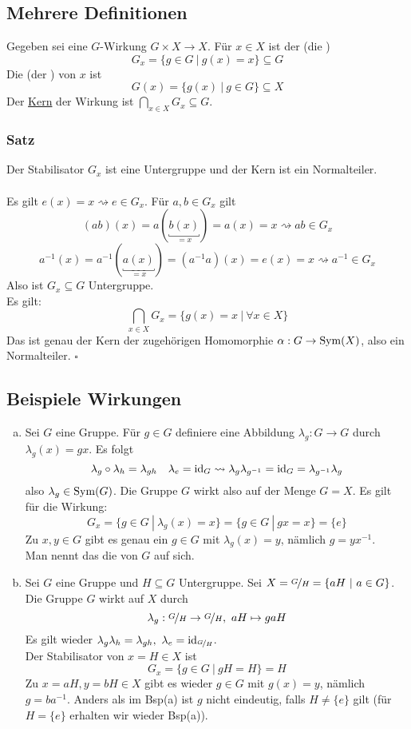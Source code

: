 \subsection{Mehrere Definitionen}
\label{sub:mehrere_def}
Gegeben sei eine $G$-Wirkung $G\times X\to X$. 
Für $x\in X$ ist der  (die )
\[
G_x=\{g\in G~|~g(x)=x \}\subseteq G 
\]
Die  (der ) von $x$ ist 
\[
G(x)=\{g(x)~|~g\in G \}\subseteq X 
\]
Der \uline{Kern} der Wirkung ist $\bigcap\limits_{x\in X}G_x\subseteq G$.

\subsubsection*{Satz}
Der Stabilisator $G_x$ ist eine Untergruppe und der Kern ist ein Normalteiler.\\

\\
Es gilt $e(x)=x \rightsquigarrow e\in G_x$. 
Für $a,b\in G_x$ gilt 
\[
(ab)(x)=a(\underbracket{b(x)}_{=x})=a(x)=x \rightsquigarrow ab\in G_x
\]
\[
a^{-1}(x)=a^{-1}(\underbracket{a(x)}_{=x})=(a^{-1}a)(x)=e(x)=x \rightsquigarrow a^{-1}\in G_x 
\]
Also ist $G_x\subseteq G$ Untergruppe.\\
Es gilt: 
\[
\bigcap\limits_{x\in X}G_x=\{g(x)=x~|~\forall x\in X \} 
\]
Das ist genau der Kern der zugehörigen Homomorphie $\alpha:G\to \operatorname{Sym}(X)$, also ein Normalteiler.
\hfill $\square$

\subsection{Beispiele Wirkungen}
\label{sub:bsp_wirkungen}
\begin{enumerate}[(a)]
	\item Sei $G$ eine Gruppe. Für $g\in G$ definiere eine Abbildung $\lambda_g:G\to G$ durch $\lambda_g(x)=gx$. Es folgt
	\[\lambda_g\circ\lambda_h=\lambda_{gh} \quad \lambda_e=\operatorname{id}_G \rightsquigarrow \lambda_g\lambda_{g^{-1}}=\operatorname{id}_G=\lambda_{g^{-1}}\lambda_g \]
	also $\lambda_g\in \operatorname{Sym}(G)$. Die Gruppe $G$ wirkt also auf der Menge $G=X$. Es gilt für die Wirkung:
	\[G_x=\{g\in G~|~\lambda_g(x)=x \}=\{g\in G~|~gx=x \}=\{e\} \]
	Zu $x,y\in G$ gibt es genau ein $g\in G$ mit $\lambda_g(x)=y$, nämlich $g=yx^{-1}$.\\
	Man nennt das die  von $G$ auf sich.
	\item Sei $G$ eine Gruppe und $H\subseteq G$ Untergruppe. Sei $X=\nicefrac{G}{H}=\{aH~|~a\in G \}$. Die Gruppe $G$ wirkt auf $X$ durch \[\lambda_g:\nicefrac{G}{H}\to \nicefrac{G}{H},~aH\mapsto gaH \]
	Es gilt wieder $\lambda_g\lambda_h=\lambda_{gh},~\lambda_e=\operatorname{id}_{\nicefrac{G}{H}}$.\\
	Der Stabilisator von $x=H\in X$ ist \[G_x=\{g\in G~|~gH=H \}=H \]
	Zu $x=aH,y=bH\in X$ gibt es wieder $g\in G$ mit $g(x)=y$, nämlich $g=ba^{-1}$. Anders als im Bsp(a) ist $g$ nicht eindeutig, falls $H\not= \{e\}$ gilt (für $H=\{e\}$ erhalten wir wieder Bsp(a)). 
\end{enumerate}

